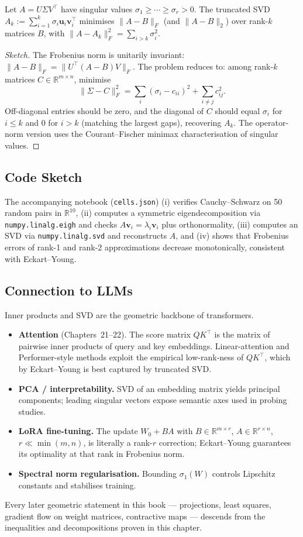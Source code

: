 \begin{theorem}
Let $A=U\Sigma V^\top$ have singular values $\sigma_1\ge\cdots\ge\sigma_r>0$. The truncated SVD $A_k:=\sum_{i=1}^{k}\sigma_i\mathbf{u}_i\mathbf{v}_i^\top$ minimises $\|A-B\|_F$ (and $\|A-B\|_2$) over rank-$k$ matrices $B$, with $\|A-A_k\|_F^2=\sum_{i>k}\sigma_i^2$.
\end{theorem}
\begin{proof}[Sketch]
The Frobenius norm is unitarily invariant: $\|A-B\|_F=\|U^\top(A-B)V\|_F$. The problem reduces to: among rank-$k$ matrices $C\in\mathbb{R}^{m\times n}$, minimise
\[
\|\Sigma-C\|_F^2=\sum_i(\sigma_i-c_{ii})^2+\sum_{i\ne j}c_{ij}^2.
\]
Off-diagonal entries should be zero, and the diagonal of $C$ should equal $\sigma_i$ for $i\le k$ and $0$ for $i>k$ (matching the largest gaps), recovering $A_k$. The operator-norm version uses the Courant--Fischer minimax characterisation of singular values.
\end{proof}

\subsection*{Code Sketch}

The accompanying notebook (\texttt{cells.json}) (i) verifies Cauchy--Schwarz on 50 random pairs in $\mathbb{R}^{10}$, (ii) computes a symmetric eigendecomposition via \texttt{numpy.linalg.eigh} and checks $A\mathbf{v}_i=\lambda_i\mathbf{v}_i$ plus orthonormality, (iii) computes an SVD via \texttt{numpy.linalg.svd} and reconstructs $A$, and (iv) shows that Frobenius errors of rank-1 and rank-2 approximations decrease monotonically, consistent with Eckart--Young.

\subsection*{Connection to LLMs}

Inner products and SVD are the geometric backbone of transformers.

\begin{itemize}
  \item \textbf{Attention} (Chapters~21--22). The score matrix $QK^\top$ is the matrix of pairwise inner products of query and key embeddings. Linear-attention and Performer-style methods exploit the empirical low-rank-ness of $QK^\top$, which by Eckart--Young is best captured by truncated SVD.
  \item \textbf{PCA / interpretability.} SVD of an embedding matrix yields principal components; leading singular vectors expose semantic axes used in probing studies.
  \item \textbf{LoRA fine-tuning.} The update $W_0+BA$ with $B\in\mathbb{R}^{m\times r}$, $A\in\mathbb{R}^{r\times n}$, $r\ll\min(m,n)$, is literally a rank-$r$ correction; Eckart--Young guarantees its optimality at that rank in Frobenius norm.
  \item \textbf{Spectral norm regularisation.} Bounding $\sigma_1(W)$ controls Lipschitz constants and stabilises training.
\end{itemize}

Every later geometric statement in this book --- projections, least squares, gradient flow on weight matrices, contractive maps --- descends from the inequalities and decompositions proven in this chapter.
